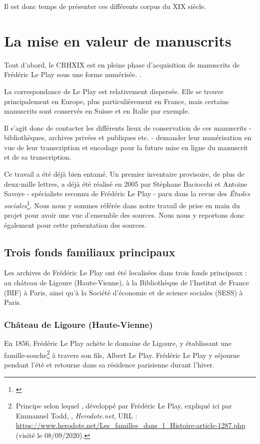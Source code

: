 Il est donc temps de présenter ces différents corpus du XIX siècle.

\section{La mise en valeur de manuscrits}

Tout d'abord, le CRHXIX est en pleine phase d'acquisition de manuscrits de Frédéric Le Play sous une forme numérisée. .

La correspondance de Le Play est relativement dispersée. Elle se trouve principalement en Europe, plus particulièrement en France, mais certains manuscrits sont conservés en Suisse et en Italie par exemple. 

Il s'agit donc de contacter les différents lieux de conservation de ces manuscrits - bibliothèques,  archives privées et publiques etc. - demander leur numérisation en vue de leur transcription et encodage pour la future mise en ligne du manuscrit et de sa transcription.

Ce travail a été déjà bien entamé. 
Un premier inventaire provisoire, de plus de deux-mille lettres, a déjà été réalisé en 2005 par Stéphane Baciocchi et Antoine Savoye - spécialiste reconnu de Frédéric Le Play - paru dans la revue des \emph{Études sociales}\footnote{\cite{inventaire}}. Nous nous y sommes référée dans notre travail de prise en main du projet pour avoir une vue d'ensemble des sources. Nous nous y reportons donc également pour cette présentation des sources. 

\subsection{Trois fonds familiaux principaux}

Les archives de Frédéric Le Play ont été localisées dans trois fonds principaux : au château de Ligoure (Haute-Vienne), à la Bibliothèque de l'Institut de France (BIF) à Paris, ainsi qu'à la Société d'économie et de science sociales (SESS) à Paris.

\subsubsection{Château de Ligoure (Haute-Vienne)}
En 1856, Frédéric Le Play achète le domaine de Ligoure, y établissant une famille-souche\footnote{Principe selon lequel , développé par Frédéric Le Play, expliqué ici par Emmanuel Todd, , \emph{Herodote.net}, URL : \url{https://www.herodote.net/Les_familles_dans_l_Histoire-article-1287.php} (visité le 08/09/2020).} à travers son fils, Albert Le Play. Frédéric Le Play y séjourne pendant l'été et retourne dans sa résidence parisienne durant l'hiver.

